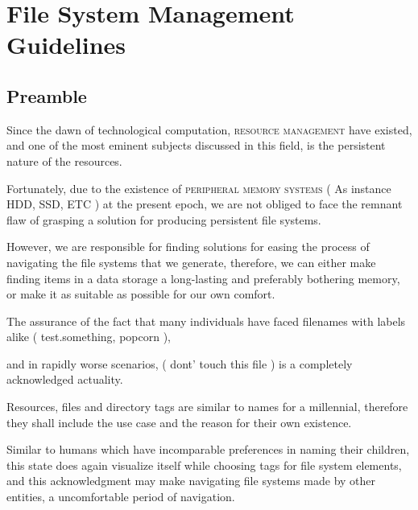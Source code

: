 \documentclass[13pt]{scrarticle}
\newcommand{\header}[1]{ \textsf{#1} \relax{}}
\newcommand{\name}[1]{{\textsc{#1}}}
\begin{document}
    \newpage
    \section{\header{File System Management Guidelines}}
    \subsection{\header{Preamble}}


    Since the dawn of technological computation, \name{resource management} have existed,
    and one of the most eminent subjects discussed in this field, is the persistent nature of the resources. \newline

    Fortunately, due to the existence of \name{peripheral memory systems}\footnotemark{} ( As instance \name{HDD}\footnotemark{}, \name{SSD}\footnotemark{}, ETC ) at the present epoch,
    we are not obliged to face the remnant flaw of grasping a solution for producing persistent file systems. \newline

    However, we are responsible for finding solutions for easing the process of navigating the file systems that we generate,
    therefore, we can either make finding items in a data storage a long-lasting and preferably bothering memory,
    or make it as suitable as possible for our own comfort. \newline

    The assurance of the fact that many individuals have faced filenames with labels alike ( test.something, popcorn ),

    and in rapidly worse scenarios, ( dont' touch this file ) is a completely acknowledged actuality. \newline

    Resources, files and directory tags are similar to names for a millennial,
    therefore they shall include the use case and the reason for their own existence. \newline



    \newpage
    Similar to humans which have incomparable preferences in naming their children,
    this state does again visualize itself while choosing tags for file system elements,
    and this acknowledgment may make navigating file systems made by other entities,
    a uncomfortable period of navigation. \newline
\end{document}
